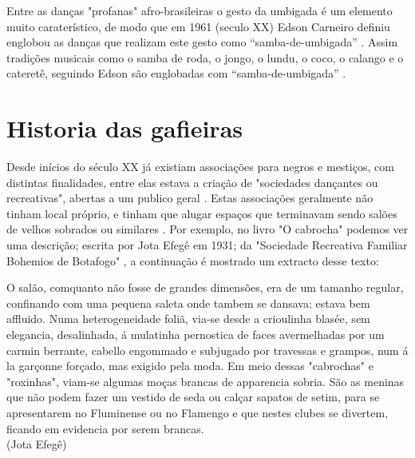Entre as danças "profanas"\cite[pp. 85]{sandroni2001feitico} afro-brasileiras o gesto da umbigada é um elemento muito caraterístico,
de modo que em 1961 (seculo XX) Edson Carneiro definiu englobou as danças que realizam este 
gesto como ``samba-de-umbigada'' . Assim tradições 
musicais como o samba de roda, o jongo, o lundu, o coco, o calango e o cateretê, 
seguindo Edson são englobadas com  ``samba-de-umbigada'' \cite[pp. 85]{sandroni2001feitico}.



\section{Historia das gafieiras}




Desde inícios do século XX já existiam associações para negros e mestiços, 
com distintas  finalidades, entre elas estava a criação de "sociedades dançantes ou recreativas", 
abertas a um publico geral
\cite[pp. 154-155]{neres1999negro} \cite[pp. 71]{de2008bexiga}.
Estas associações geralmente não tinham local próprio, 
e tinham que alugar espaços que terminavam sendo salões de velhos sobrados
ou similares \cite[pp. 154-155]{neres1999negro} \cite[pp. 49]{diniz2003almanaque}.
Por exemplo, no livro "O cabrocha" podemos ver uma descrição; escrita  por Jota Efegê em 1931; 
da "Sociedade Recreativa Familiar Bohemios de Botafogo" \cite{jotaefege},
a continuação é mostrado um extracto desse texto:

\begin{tcolorbox}[colback=lowgray,colframe=lowgray]%
O salão, comquanto não fosse de grandes dimensões, era
de um tamanho regular, confinando com uma pequena saleta
onde tambem se dansava; estava bem affluido. Numa
heterogeneidade foliã, via-se desde a crioulinha blasée, sem
elegancia, desalinhada, á mulatinha pernostica de faces
avermelhadas por um carmin berrante, cabello engommado e
subjugado por travessas e grampos, num á la garçonne
forçado, mas exigido pela moda. Em meio dessas "cabrochas"
e "roxinhas", viam-se algumas moças brancas de apparencia
sobria. São as meninas que não podem fazer um vestido de
seda ou calçar sapatos de setim, para se apresentarem no
Fluminense ou no Flamengo e que nestes clubes se divertem,
ficando em evidencia por serem brancas.
~\\
(Jota Efegê)
\end{tcolorbox}



